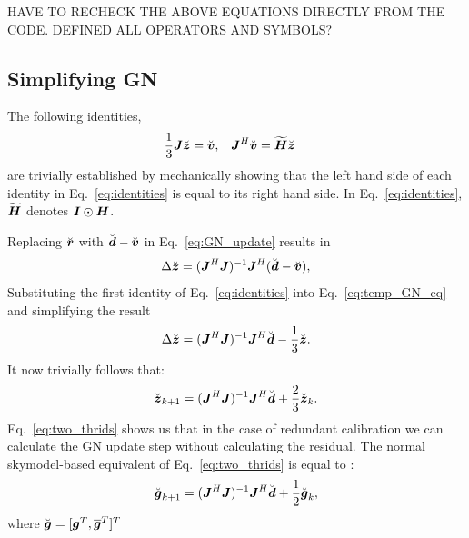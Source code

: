 \documentclass[useAMS,usenatbib]{mn2e}
\newcommand{\bz}{\bmath{z}}
\newcommand{\br}{\bmath{r}}
\newcommand{\bg}{\bmath{g}}
\newcommand{\bd}{\bmath{d}}
\newcommand{\bv}{\bmath{v}}
\newcommand{\bJ}{\bmath{J}}
\newcommand{\bH}{\bmath{H}}
\newcommand{\bI}{\bmath{I}}
\newcommand{\conj}[1]{\overline{#1}}
\begin{document}
HAVE TO RECHECK THE ABOVE EQUATIONS DIRECTLY FROM THE CODE.
DEFINED ALL OPERATORS AND SYMBOLS?




\subsection{Simplifying GN}

The following identities,
\begin{align}
\label{eq:identities}
\frac{1}{3}\bJ\breve{\bz} &= \breve{\bv}, & \bJ^H\breve{\bv} &= \widetilde{\bH}\breve{\bz} 
\end{align}
are trivially established by mechanically showing that the left hand side of each identity in Eq.~\eqref{eq:identities} is equal to its right hand side.
In Eq.~\eqref{eq:identities}, $\widetilde{\bH}$ denotes $\bI\odot\bH$.

Replacing $\breve{\br}$ with $\breve{\bd}-\breve{\bv}$ in Eq.~\eqref{eq:GN_update} results in
\begin{equation}
\label{eq:temp_GN_eq}
\Delta \breve{\bz} = (\bJ^H\bJ)^{-1}\bJ^H(\breve{\bd}-\breve{\bv}), 
\end{equation}
Substituting the first identity of Eq.~\eqref{eq:identities} into Eq.~\eqref{eq:temp_GN_eq} and simplifying the result 
\begin{equation}
\label{eq:one_thrid}
\Delta \breve{\bz} = (\bJ^H\bJ)^{-1}\bJ^H\breve{\bd}-\frac{1}{3}\breve{\bz}.
\end{equation}
It now trivially follows that:
\begin{equation}
\label{eq:two_thrids}
\breve{\bz}_{k+1} = (\bJ^H\bJ)^{-1}\bJ^H\breve{\bd} + \frac{2}{3}\breve{\bz}_{k}. 
\end{equation}
Eq.~\eqref{eq:two_thrids} shows us that in the case of redundant calibration we can calculate the GN update step without calculating the residual. The 
normal skymodel-based equivalent of Eq.~\eqref{eq:two_thrids} is equal to \citep{Smirnov2015}:
\begin{equation}
\label{eq:one_half}
\breve{\bg}_{k+1} = (\bJ^H\bJ)^{-1}\bJ^H\breve{\bd} + \frac{1}{2}\breve{\bg}_{k}, 
\end{equation}
where $\breve{\bg} = [\bg^T,\conj{\bg}^T]^T$
\end{document}
